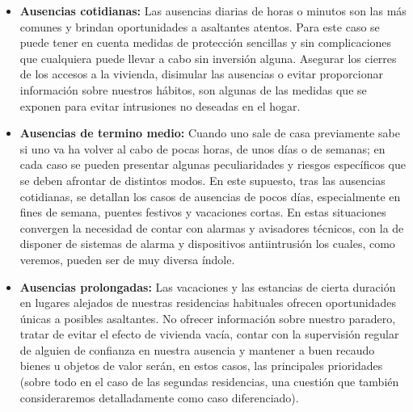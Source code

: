\begin{itemize}

    \item \textbf{Ausencias cotidianas:}
    Las ausencias diarias de horas o minutos son las más comunes y brindan oportunidades a asaltantes atentos. Para este caso se puede tener en cuenta medidas de protección sencillas y sin complicaciones que cualquiera puede llevar a cabo sin inversión alguna. Asegurar los cierres de los accesos a la vivienda, disimular las ausencias o evitar proporcionar información sobre nuestros hábitos, son algunas de las medidas que se exponen para evitar intrusiones no deseadas en el hogar.\\
 

    \item \textbf{Ausencias de termino medio:}
    Cuando uno sale de casa previamente sabe si uno va ha volver al cabo de pocas horas, de unos días o de semanas; en cada caso se pueden presentar algunas peculiaridades y riesgos específicos que se deben afrontar de distintos modos. En este supuesto, tras las ausencias cotidianas, se detallan los casos de ausencias de pocos días, especialmente en fines de semana, puentes festivos y vacaciones cortas. En estas situaciones convergen la necesidad de contar con alarmas y avisadores técnicos, con la de disponer de sistemas de alarma y dispositivos antiintrusión los cuales, como veremos, pueden ser de muy diversa índole.\\

    \item \textbf{Ausencias prolongadas:}
    Las vacaciones y las estancias de cierta duración en lugares alejados de nuestras residencias habituales ofrecen oportunidades únicas a posibles asaltantes. No ofrecer información sobre nuestro paradero, tratar de evitar el efecto de vivienda vacía, contar con la supervisión regular de alguien de confianza en nuestra ausencia y mantener a buen recaudo bienes u objetos de valor serán, en estos casos, las principales prioridades (sobre todo en el caso de las segundas residencias, una cuestión que también consideraremos detalladamente como caso diferenciado).\\
\end{itemize}

